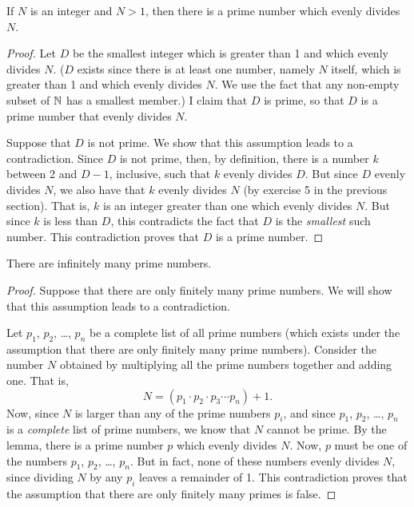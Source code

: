 \begin{lemma}\label{helpful}
If $N$ is an integer and $N>1$, then there is a prime number
which evenly divides $N$.
\end{lemma}
\begin{proof}
Let $D$ be the smallest integer which is greater than 1 and
which evenly divides $N$.  ($D$ exists since there is at least one
number, namely $N$ itself, which is greater than 1 and which
evenly divides $N$.  We use the fact that any non-empty subset
of ${\mathbb N}$ has a smallest member.)  I claim that $D$ is prime, so that
$D$ is a prime number that evenly divides $N$.

Suppose that $D$ is not prime.  We show that this assumption
leads to a contradiction.  Since $D$ is not prime, then, by definition,
there is a number $k$ between 2 and $D-1$, inclusive, such that
$k$ evenly divides $D$.  But since $D$ evenly divides $N$, we also
have that $k$ evenly divides $N$ (by exercise 5 in the previous section).  That is, $k$ is an integer
greater than one which evenly divides $N$.  But since $k$ is
less than $D$, this contradicts the fact that $D$ is the \emph{smallest}
such number.  This contradiction proves that $D$ is a prime number.
\end{proof}

\begin{theorem}
There are infinitely many prime numbers.
\end{theorem}
\begin{proof}
Suppose that there are only finitely many prime numbers.  We will
show that this assumption leads to a contradiction.

Let $p_1$, $p_2$, \dots, $p_n$ be a complete list of all prime numbers
(which exists under the assumption that there are only finitely many
prime numbers).  Consider the number $N$ obtained by multiplying
all the prime numbers together and adding one.  That is,
\[N=(p_1\cdot p_2\cdot p_3\cdots p_n) + 1.\]
Now, since $N$ is larger than any of the prime numbers $p_i$, and
since $p_1$, $p_2$, \dots, $p_n$ is a \emph{complete} list of prime numbers,
we know that $N$ cannot be prime.  By the lemma, there is a prime
number $p$ which evenly divides $N$.  Now, $p$ must be one of the
numbers $p_1$, $p_2$, \dots, $p_n$.  But in fact, none of these numbers evenly
divides $N$, since dividing $N$ by any $p_i$ leaves a remainder of 1.
This contradiction proves that the assumption that there are only
finitely many primes is false.
\end{proof}


